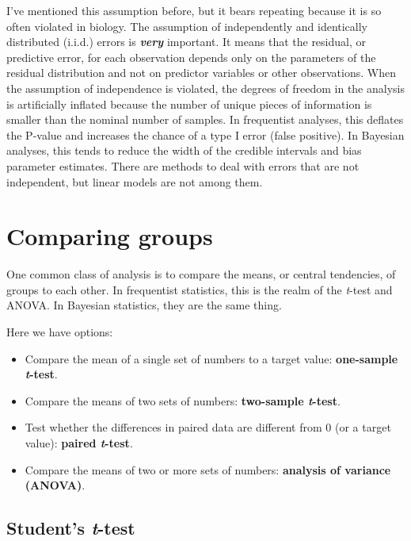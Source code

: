 \documentclass[
  13,
  letterpaper,
]{report}
\providecommand{\tightlist}{%
  \setlength{\itemsep}{0pt}\setlength{\parskip}{0pt}}
\begin{document}
I've mentioned this assumption before, but it bears repeating because it
is so often violated in biology. The assumption of independently and
identically distributed (i.i.d.) errors is \textbf{\emph{very}}
important. It means that the residual, or predictive error, for each
observation depends only on the parameters of the residual distribution
and not on predictor variables or other observations. When the
assumption of independence is violated, the degrees of freedom in the
analysis is artificially inflated because the number of unique pieces of
information is smaller than the nominal number of samples. In
frequentist analyses, this deflates the P-value and increases the chance
of a type I error (false positive). In Bayesian analyses, this tends to
reduce the width of the credible intervals and bias parameter estimates.
There are methods to deal with errors that are not independent, but
linear models are not among them.

\section{Comparing groups}\label{sec-linear-groups}

One common class of analysis is to compare the means, or central
tendencies, of groups to each other. In frequentist statistics, this is
the realm of the \emph{t}-test and ANOVA. In Bayesian statistics, they
are the same thing.

Here we have options:

\begin{itemize}
\tightlist
\item
  Compare the mean of a single set of numbers to a target value:
  \textbf{one-sample \emph{t}-test}.
\item
  Compare the means of two sets of numbers: \textbf{two-sample
  \emph{t}-test}.
\item
  Test whether the differences in paired data are different from 0 (or a
  target value): \textbf{paired \emph{t}-test}.
\item
  Compare the means of two or more sets of numbers: \textbf{analysis of
  variance (ANOVA)}.
\end{itemize}

\subsection{\texorpdfstring{Student's
\emph{t}-test}{Student's t-test}}\label{sec-linear-groups-studentt}
\end{document}
